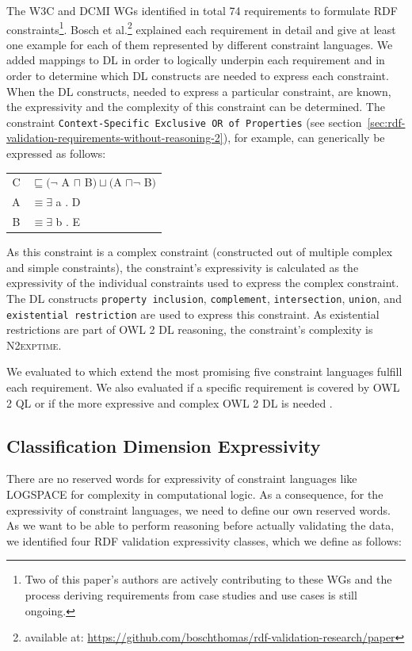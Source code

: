 \documentclass{llncs}
\newcommand{\ms}[1]{\texttt{#1}}
\newenvironment{DL}{
  \begin{tabular}{r l}

}{
  \end{tabular}
  \linebreak
}
\begin{document}
The W3C and DCMI WGs identified in total 74 requirements to formulate RDF constraints\footnote{Two of this paper's authors are actively contributing to these WGs and the process deriving requirements from case studies and use cases is still ongoing.}.
Bosch et al.\footnote{available at: \url{https://github.com/boschthomas/rdf-validation-research/paper}} explained each requirement in detail and give at least one example for each of them represented by different constraint languages.
We added mappings to DL in order to logically underpin each requirement and in order to determine which DL constructs are needed to express each constraint.
When the DL constructs, needed to express a particular constraint, are known, the expressivity and the complexity of this constraint can be determined. 
The constraint \ms{Context-Specific Exclusive OR of Properties} (see section~\ref{sec:rdf-validation-requirements-without-reasoning-2}), for example, can generically be expressed as follows:
\begin{center}
\begin{DL}
C &$\sqsubseteq (\neg$ A $\sqcap$ B$) \sqcup ($A $\sqcap \neg$ B$)$ \\
A &$\equiv \exists$ a . D \\
B &$\equiv \exists$ b . E  
\end{DL}
\end{center}
As this constraint is a complex constraint (constructed out of multiple complex and simple constraints), 
the constraint's expressivity is calculated as the expressivity of the individual constraints used to express the complex constraint.
The DL constructs \ms{property inclusion}, \ms{complement}, \ms{intersection}, \ms{union}, and \ms{existential restriction} are used to express this constraint.  
As existential restrictions are part of OWL 2 DL reasoning, the constraint's complexity is \textsc{N2exptime}.
 
We evaluated to which extend the most promising five constraint languages fulfill each requirement.
We also evaluated if a specific requirement is covered by OWL 2 QL or if the more expressive and complex OWL 2 DL is needed \cite{BoschNolleAcarEckert2015}.

\subsection{Classification Dimension Expressivity}

There are no reserved words for expressivity of constraint languages like LOGSPACE for complexity in computational logic.
As a consequence, for the expressivity of constraint languages, we need to define our own reserved words.
As we want to be able to perform reasoning before actually validating the data, we identified four RDF validation expressivity classes, 
which we define as follows: 
\end{document}
